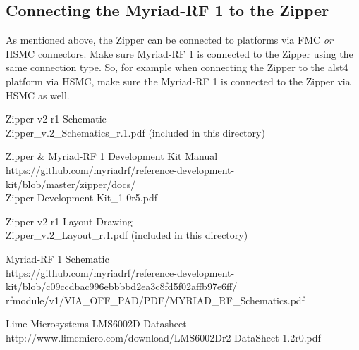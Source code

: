 \subsection*{Connecting the Myriad-RF 1 to the Zipper}
As mentioned above, the Zipper can be connected to platforms via FMC \textit{or} HSMC connectors. Make sure Myriad-RF 1 is connected to the Zipper using the same connection type. So, for example when connecting the Zipper to the alst4 platform via HSMC, make sure the Myriad-RF 1 is connected to the Zipper via HSMC as well.
\pagebreak
  \begin{thebibliography}{1}

   Zipper v2 r1 Schematic\\
	 Zipper\_v.2\_Schematics\_r.1.pdf (included in this directory)

   Zipper \& Myriad-RF 1 Development Kit Manual\\ https://github.com/myriadrf/reference-development-kit/blob/master/zipper/docs/\\Zipper Development Kit\_1 0r5.pdf

   Zipper v2 r1 Layout Drawing\\
	 Zipper\_v.2\_Layout\_r.1.pdf (included in this directory)

   Myriad-RF 1 Schematic\\ https://github.com/myriadrf/reference-development-kit/blob/c09ccdbac996ebbbbd2ea3c8fd5f02affb97e6ff/\\rfmodule/v1/VIA\_OFF\_PAD/PDF/MYRIAD\_RF\_Schematics.pdf

   Lime Microsystems LMS6002D Datasheet\\
	 http://www.limemicro.com/download/LMS6002Dr2-DataSheet-1.2r0.pdf

  \end{thebibliography}

